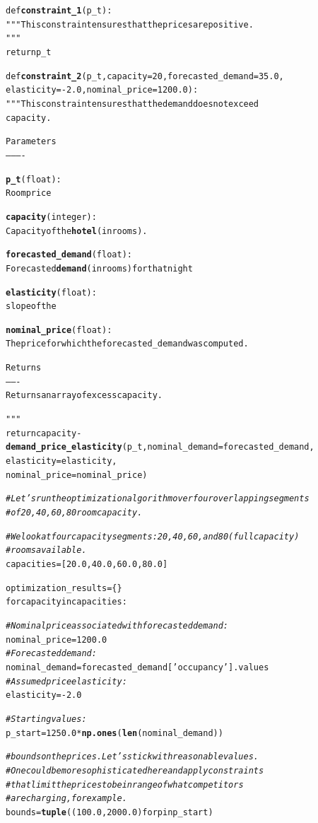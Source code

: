 \documentclass{article}\usepackage[]{graphicx}\usepackage[]{color}
\makeatletter
\newcommand{\hlstr}[1]{\textcolor[rgb]{0.192,0.494,0.8}{#1}}%
\newcommand{\hlcom}[1]{\textcolor[rgb]{0.678,0.584,0.686}{\textit{#1}}}%
\newcommand{\hlkwd}[1]{\textcolor[rgb]{0.737,0.353,0.396}{\textbf{#1}}}%
\newenvironment{kframe}{%
 \def\at@end@of@kframe{}%
 \ifinner\ifhmode%
  \def\at@end@of@kframe{\end{minipage}}%
  \begin{minipage}{\columnwidth}%
 \fi\fi%
 \def\FrameCommand##1{\hskip\@totalleftmargin \hskip-\fboxsep
 \colorbox{shadecolor}{##1}\hskip-\fboxsep
     \hskip-\linewidth \hskip-\@totalleftmargin \hskip\columnwidth}%
 \MakeFramed {\advance\hsize-\width
   \@totalleftmargin\z@ \linewidth\hsize
   \@setminipage}}%
 {\par\unskip\endMakeFramed%
 \at@end@of@kframe}
\newenvironment{knitrout}{}{} %
\makeatother
\begin{document}
\begin{knitrout}
\begin{kframe}
\begin{alltt}
def \hlkwd{constraint_1}(p_t):
    \hlstr{""}" This constraint ensures that the prices are positive.
    \hlstr{""}"
    return p_t


def \hlkwd{constraint_2}(p_t, capacity=20, forecasted_demand=35.0,
                 elasticity=-2.0, nominal_price=1200.0):
    \hlstr{""}" This constraint ensures that the demand does not exceed
    capacity.

    Parameters
    ----------

    \hlkwd{p_t} (float):
        Room price

    \hlkwd{capacity} (integer):
        Capacity of the \hlkwd{hotel} (in rooms).

    \hlkwd{forecasted_demand} (float):
        Forecasted \hlkwd{demand} (in rooms) for that night

    \hlkwd{elasticity} (float):
        slope of the

    \hlkwd{nominal_price} (float):
        The price for which the forecasted_demand was computed.

    Returns
    -------
    Returns an array of excess capacity.

    \hlstr{""}"
    return capacity - \hlkwd{demand_price_elasticity}(p_t, nominal_demand=forecasted_demand,
                                                        elasticity=elasticity,
                                                        nominal_price=nominal_price)

\hlcom{# Let's run the optimization algorithm over four overlapping segments}
\hlcom{# of 20, 40, 60, 80 room capacity.}

\hlcom{# We look at four capacity segments: 20, 40, 60, and 80 (full capacity)}
\hlcom{# rooms available.}
capacities = [20.0, 40.0, 60.0, 80.0]

optimization_results = \{\}
for capacity in capacities:

\hlcom{    # Nominal price associated with forecasted demand:}
    nominal_price = 1200.0
\hlcom{    # Forecasted demand:}
    nominal_demand = forecasted_demand[\hlstr{'occupancy'}].values
\hlcom{    # Assumed price elasticity:}
    elasticity = -2.0

\hlcom{    # Starting values:}
    p_start = 1250.0 * \hlkwd{np.ones}(\hlkwd{len}(nominal_demand))

\hlcom{    # bounds on the prices. Let's stick with reasonable values.}
\hlcom{    # One could be more sophisticated here and apply constraints}
\hlcom{    # that limit the prices to be in range of what competitors}
\hlcom{    # are charging, for example.}
    bounds = \hlkwd{tuple}((100.0, 2000.0) for p in p_start)


\end{alltt}
\end{kframe}
\end{knitrout}
\end{document}

